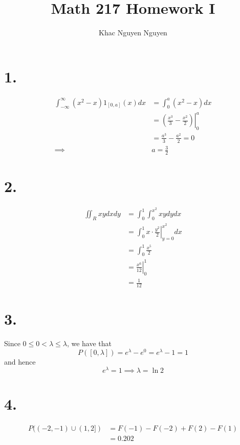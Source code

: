 \documentclass[11pt]{article}
\title{\textbf{Math 217 Homework I}}
\author{Khac Nguyen Nguyen}
\date{}
\begin{document}
\section*{1.}
\begin{equation*}
    \begin{aligned}
        \int_{-\infty}^\infty (x^2-x)1_{[0,a]}(x)dx 
        &= \int_0^a (x^2-x)dx \\
        &= \left.\left(\frac{x^3}{3} - \frac{x^2}{2}\right)\right|_0^a \\
        &= \frac{a^3}{3} - \frac{a^2}{2} = 0 \\
        \implies &a= \frac{3}{2}
    \end{aligned}
\end{equation*}
\pagebreak
\section*{2.}
\begin{equation*}
    \begin{aligned}
        \iint_R xy dx dy &= \int_0^1 \int_0^{x^2} xy dy dx \\
        &= \int_0^1 x \cdot \left.\frac{y^2}{2} \right|^{x^2}_{y=0} dx \\
        &= \int_0^1 \frac{x^5}{2} \\
        &= \left.\frac{x^6}{12} \right|_0^1 \\
        &= \frac{1}{12}
    \end{aligned}
\end{equation*}
\pagebreak
\section*{3.}
Since $0\le 0 < \lambda \le \lambda$, we have that
\[
    P([0,\lambda]) = e^\lambda - e^0 = e^\lambda - 1 = 1
\]
and hence
\[
    e^\lambda = 1 \implies \lambda = \ln2    
\]
\pagebreak
\section*{4.}
\begin{equation*}
    \begin{aligned}
        P((-2,-1) \cup (1,2]) &= F(-1) - F(-2) + F(2) - F(1) \\
        &= 0.202
    \end{aligned}
\end{equation*}
\end{document}
